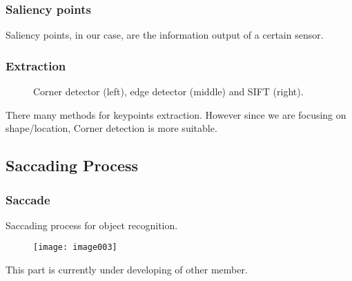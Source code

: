 \documentclass{beamer}
\begin{document}
\begin{frame}
\frametitle{Saliency points}

Saliency points, in our case, are the information output of a certain sensor.

\end{frame}


\begin{frame}
\frametitle{Extraction}

\begin{figure}
  \centering
  \caption{Corner detector (left), edge detector (middle) and SIFT (right).}
  \label{fig:2.5}
\end{figure}

There many methods for keypoints extraction. However since we are focusing on shape/location, Corner detection is more suitable. 

\end{frame}


\subsection{Saccading Process}


\begin{frame}
\frametitle{Saccade}
Saccading process for object recognition.
\begin{figure}
\centering    
\texttt{[image: image003]}
\label{fig:2.5}
\end{figure}%




This part is currently under developing of other member.
\end{frame}
\end{document}
